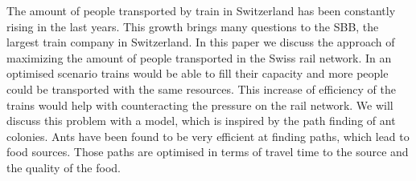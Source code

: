 The amount of people transported by train in Switzerland has been constantly rising in the last years. This growth brings many questions to the SBB, the largest train company in Switzerland. \citep{SbbStats} In this paper we discuss the approach of maximizing the amount of people transported in the Swiss rail network. In an optimised scenario trains would be able to fill their capacity and more people could be transported with the same resources. This increase of efficiency of the trains would help with counteracting the pressure on the rail network. 
We will discuss this problem with a model, which is inspired by the path finding of ant colonies. Ants have been found to be very efficient at finding paths, which lead to food sources. Those paths are optimised in terms of travel time to the source and the quality of the food.